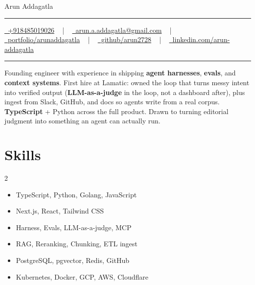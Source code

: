 \documentclass[letterpaper,10pt]{article}
\newcommand{\documentTitle}[2]{
  \begin{center}
    {\Huge\color{accentTitle} #1}
    \vspace{10pt}
    {\color{accentLine} \hrule}
    \vspace{2pt}
    \footnotesize{#2}
    \vspace{2pt}
    {\color{accentLine} \hrule}
  \end{center}
}
\begin{document}

\documentTitle{Arun Addagatla}{
    \href{tel:+918485019026}{
      \raisebox{-0.05\height} \faPhone\ +918485019026} ~ | ~
    \href{mailto:arun.a.addagatla@gmail.com}{
      \raisebox{-0.15\height} \faEnvelope\ arun.a.addagatla@gmail.com} ~ | ~
    \href{https://arunaddagatla.vercel.app/}{
      \raisebox{-0.15\height} \faGlobe\ portfolio/arunaddagatla} ~ | ~
    \href{https://github.com/arun2728}{
      \raisebox{-0.15\height} \faGithub\ github/arun2728} ~ | ~
      \href{https://linkedin.com/in/arun-addagatla/}{
      \raisebox{-0.15\height} \faLinkedin\ linkedin.com/arun-addagatla}
     
}


  \vspace{4pt}
  {\small Founding engineer with experience in shipping \textbf{agent harnesses}, \textbf{evals}, and \textbf{context systems}. First hire at Lamatic: owned the loop that turns messy intent into verified output (\textbf{LLM-as-a-judge} in the loop, not a dashboard after), plus ingest from Slack, GitHub, and docs so agents write from a real corpus. \textbf{TypeScript} + Python across the full product. Drawn to turning editorial judgment into something an agent can actually run.}
  \vspace{2pt}


  \section{Skills}

\begin{multicols}{2}
  \begin{itemize}[itemsep=-2px, parsep=1pt, leftmargin=75pt]
    \item[\textbf{Languages}] TypeScript, Python, Golang, JavaScript
    \item[\textbf{Frontend}] Next.js, React, Tailwind CSS
    \item[\textbf{AI/Agents}] Harness, Evals, LLM-as-a-judge, MCP
    \item[\textbf{Context}] RAG, Reranking, Chunking, ETL ingest
    \item[\textbf{Backend/Data}] PostgreSQL, pgvector, Redis, GitHub
    \item[\textbf{Cloud/Infra}] Kubernetes, Docker, GCP, AWS, Cloudflare
  \end{itemize}
\end{multicols}
\end{document}
